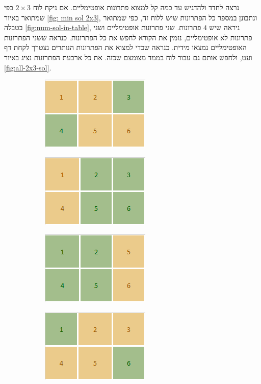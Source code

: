 \documentclass[12pt,leqno]{article}
\theoremstyle{theoremdd}
\begin{document}
נרצה לחדד ולהדגיש עד כמה קל למצוא פתרונות אופטימליים.
אם ניקח לוח 
$2 \times 3$
כפי שמתואר 
באיור 
\ref{fig: min sol 2x3},
ונתבונן במספר כל הפתרונות שיש ללוח זה,
כפי
שמתואר בטבלה 
\ref{fig:num-sol-in-table},
ניראה שיש 
$4$
פתרונות.
שני פתרונות אופטימליים 
ושני פתרונות לא אופטימליים,
נזמין את הקורא לחפש את כל הפתרונות.
כנראה ששני הפתרונות האופטימליים נמצאו מידית.
כנראה שכדי למצוא את הפתרונות הנותרים 
נצטרך לקחת דף ועט, ולחפש אותם גם עבור לוח בממד מצומצם שכזה.
את כל ארבעת הפתרונות נציג באיור 
\ref{fig:all-2x3-sol}.

\begin{figure}[ht]
    \caption{משחק על גרף לדוגמה}
    \label{fig:all-2x3-sol}
    \centering
    \begin{subfigure}{.20\textwidth}
        \centering
        \includegraphics{images/min_sol_2x3.PNG}
    \end{subfigure}%
    \begin{subfigure}{.20\textwidth}
        \centering
        \includegraphics{images/2x3_2.png}
    \end{subfigure}%
    \begin{subfigure}{.20\textwidth}
        \centering
        \includegraphics{images/2x3_3.png}
    \end{subfigure}%
    \begin{subfigure}{.20\textwidth}
        \centering
        \includegraphics{images/2x3_4.png}
    \end{subfigure}%
\end{figure}
\end{document}
